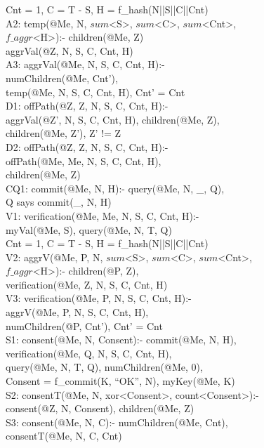\begin{code}
\> Cnt = 1, C = T - S, H = f\_hash(N||S||C||Cnt)\\
A2: temp(@Me, N, $sum$<S>, $sum$<C>, $sum$<Cnt>, \\
\> $f\_aggr$<H>):- children(@Me, Z)\\
\> aggrVal(@Z, N, S, C, Cnt, H) \\
A3: aggrVal(@Me, N, S, C, Cnt, H):- \\
\> numChildren(@Me, Cnt'),\\
\> temp(@Me, N, S, C, Cnt, H), Cnt' = Cnt\\
D1: offPath(@Z, Z, N, S, C, Cnt, H):-\\
\> aggrVal(@Z', N, S, C, Cnt, H), children(@Me, Z),\\
\> children(@Me, Z'), Z' != Z\\
D2: offPath(@Z, Z, N, S, C, Cnt, H):-\\
\> offPath(@Me, Me, N, S, C, Cnt, H), \\
\> children(@Me, Z)\\
CQ1: commit(@Me, N, H):- query(@Me, N, \_, Q),\\
\> Q says commit(\_, N, H)\\
V1: verification(@Me, Me, N, S, C, Cnt, H):-\\
\> myVal(@Me, S), query(@Me, N, T, Q)\\
\> Cnt = 1, C = T - S, H = f\_hash(N||S||C||Cnt)\\
V2: aggrV(@Me, P, N, $sum$<S>, $sum$<C>, $sum$<Cnt>,\\
\>  $f\_aggr$<H>):- children(@P, Z),\\
\> verification(@Me, Z, N, S, C, Cnt, H) \\
V3: verification(@Me, P, N, S, C, Cnt, H):-\\
\> aggrV(@Me, P, N, S, C, Cnt, H), \\
\> numChildren(@P, Cnt'), Cnt' = Cnt\\
S1: consent(@Me, N, Consent):- commit(@Me, N, H),\\
\> verification(@Me, Q, N, S, C, Cnt, H),\\
\> query(@Me, N, T, Q), numChildren(@Me, 0),\\
\> Consent = f\_commit(K, ``OK'', N), myKey(@Me, K)\\
S2: consentT(@Me, N, xor<Consent>, count<Consent>):- \\
\> consent(@Z, N, Consent), children(@Me, Z)\\
S3: consent(@Me, N, C):- numChildren(@Me, Cnt),\\
\> consentT(@Me, N, C, Cnt)\\

\end{code}
